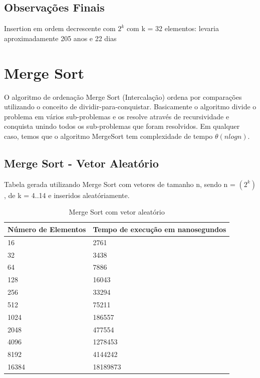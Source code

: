 \documentclass[12pt,a4paper,twoside]{report}
\begin{document}
\section{Observações Finais}
Insertion em ordem decrescente com $2^k$ com k = 32 elementos: levaria aproximadamente 205 anos e 22 dias 

\chapter{Merge Sort}
O algoritmo de ordenação Merge Sort (Intercalação) ordena por comparações utilizando o conceito de dividir-para-conquistar.
Basicamente o algoritmo divide o problema em vários sub-problemas e os resolve através de recursividade e conquista unindo todos os sub-problemas que foram resolvidos.
Em qualquer caso, temos que o algoritmo MergeSort tem complexidade de tempo $\theta(nlogn)$.

\section{Merge Sort - Vetor Aleatório}
Tabela gerada utilizando Merge Sort com vetores de tamanho n, sendo n = $(2^k)$, de k = 4..14 e inseridos aleatóriamente.
\begin{table}[H]
\centering
\caption{Merge Sort com vetor aleatório}
\label{my-label}
\begin{tabular}{|l|l|}
\hline
\multicolumn{1}{|c|}{\textbf{Número de Elementos}} & \multicolumn{1}{c|}{\textbf{Tempo de execução em nanosegundos}} \\ \hline
16 & 2761 \\ \hline
32 & 3438 \\ \hline
64 & 7886 \\ \hline
128 & 16043 \\ \hline
256 & 33294 \\ \hline
512 & 75211 \\ \hline
1024 & 186557 \\ \hline
2048 & 477554 \\ \hline
4096 & 1278453 \\ \hline
8192 & 4144242 \\ \hline
16384 & 18189873 \\ \hline
\end{tabular}
\end{table}
\end{document}
